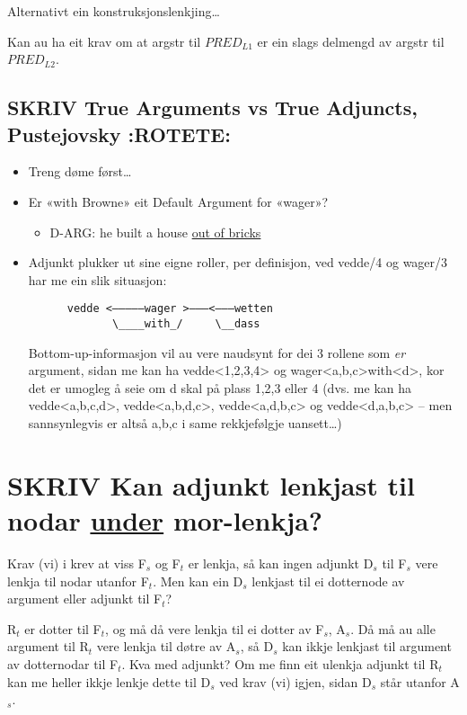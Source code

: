 \documentclass[11pt,a4paper,oneside,draft]{book}
\begin{document}
Alternativt ein konstruksjonslenkjing\ldots{} 

Kan au ha eit krav om at argstr til $PRED_{L1}$ er ein slags delmengd av
argstr til $PRED_{L2}$. 
\subsection{\textbf{SKRIV} True Arguments vs True Adjuncts, Pustejovsky \textbf{:ROTETE:}}
\label{sec-3.15.7}

\begin{itemize}
\item Treng døme først\ldots{}
\item Er «with Browne» eit Default Argument for «wager»?

\begin{itemize}
\item D-ARG: he built a house \underline{out of bricks}
\end{itemize}

\item Adjunkt plukker ut sine eigne roller, per definisjon, ved
     vedde/4 og wager/3 har me ein slik situasjon:
\begin{verbatim}
      vedde <—————wager >———<———wetten
             \____with_/     \__dass
\end{verbatim}

     Bottom-up-informasjon vil au vere naudsynt for dei 3 rollene
     som \emph{er} argument, sidan me kan ha vedde<1,2,3,4> og
     wager<a,b,c>with<d>, kor det er umogleg å seie om d skal på plass
     1,2,3 eller 4 (dvs. me kan ha vedde<a,b,c,d>, vedde<a,b,d,c>,
     vedde<a,d,b,c> og vedde<d,a,b,c> -- men sannsynlegvis er altså
     a,b,c i same rekkjefølgje uansett\ldots{})
\end{itemize}
\section{\textbf{SKRIV} Kan adjunkt lenkjast til nodar \underline{under} mor-lenkja?}
\label{sec-3.16}

\label{SEC:merge-daughters}

Krav (vi) i \citet[s.~75]{dyvik2009lmp} krev at viss F$_s$ og F$_t$ er
lenkja, så kan ingen adjunkt D$_s$ til F$_s$ vere lenkja til nodar utanfor
F$_t$. Men kan ein D$_s$ lenkjast til ei dotternode av argument eller
adjunkt til F$_t$?

R$_t$ er dotter til F$_t$, og må då vere lenkja til ei dotter av F$_s$,
A$_s$. Då må au alle argument til R$_t$ vere lenkja til døtre av A$_s$, så
D$_s$ kan ikkje lenkjast til argument av dotternodar til F$_t$. Kva med
adjunkt? Om me finn eit ulenkja adjunkt til R$_t$ kan me heller ikkje
lenkje dette til D$_s$ ved krav (vi) igjen, sidan D$_s$ står utanfor
A$_s$.
\end{document}
